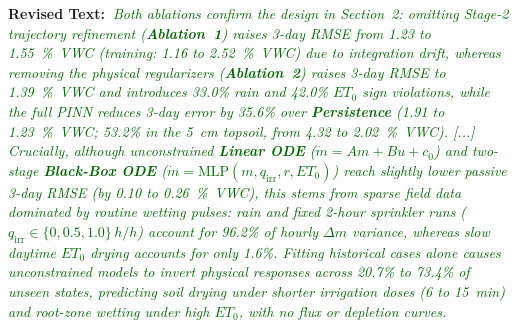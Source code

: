 \documentclass[10pt]{article}
\newcommand{\Rtext}[1]{\textbf{Revised Text:~}#1}
\begin{document}
\Rtext{\emph{\textcolor{darkgreen}{Both ablations confirm the design in Section~2: omitting Stage-2 trajectory refinement (\textbf{Ablation~1}) raises 3-day RMSE from 1.23 to 1.55~\si{\%VWC} (training: 1.16 to 2.52~\si{\%VWC}) due to integration drift, whereas removing the physical regularizers (\textbf{Ablation~2}) raises 3-day RMSE to 1.39~\si{\%VWC} and introduces 33.0\% rain and 42.0\% $ET_0$ sign violations, while the full PINN reduces 3-day error by 35.6\% over \textbf{Persistence} (1.91 to 1.23~\si{\%VWC}; 53.2\% in the 5~\si{cm} topsoil, from 4.32 to 2.02~\si{\%VWC}). [...] Crucially, although unconstrained \textbf{Linear ODE} ($\dot{m} = Am + Bu + c_0$) and two-stage \textbf{Black-Box ODE} ($\dot{m} = \mathrm{MLP}(m, q_{\mathrm{irr}}, r, ET_0)$) reach slightly lower passive 3-day RMSE (by 0.10 to 0.26~\si{\%VWC}), this stems from sparse field data dominated by routine wetting pulses: rain and fixed 2-hour sprinkler runs ($q_{\mathrm{irr}} \in \{0, 0.5, 1.0\}\,\si{h/h}$) account for 96.2\% of hourly $\Delta m$ variance, whereas slow daytime $ET_0$ drying accounts for only 1.6\%. Fitting historical cases alone causes unconstrained models to invert physical responses across 20.7\% to 73.4\% of unseen states, predicting soil drying under shorter irrigation doses (6 to 15~\si{min}) and root-zone wetting under high $ET_0$, with no flux or depletion curves.}}}
\end{document}
